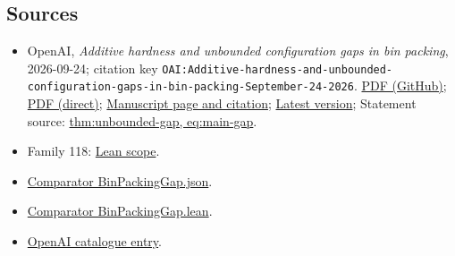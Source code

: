\documentclass[11pt]{article}
\begin{document}
\subsection{Sources}
\begin{itemize}
\item OpenAI, \emph{Additive hardness and unbounded configuration gaps in bin packing}, 2026-09-24; citation key \texttt{OAI:Additive-hardness-and-unbounded-configuration-gaps-in-bin-packing-September-24-2026}. \href{https://github.com/openai/math/blob/adc7f1241b42e322a6451854ab7e4b4c146bf78a/preprints/Additive-hardness-and-unbounded-configuration-gaps-in-bin-packing-September-24-2026/Additive-hardness-and-unbounded-configuration-gaps-in-bin-packing-September-24-2026.pdf}{PDF (GitHub)}; \href{https://github.com/openai/math/raw/adc7f1241b42e322a6451854ab7e4b4c146bf78a/preprints/Additive-hardness-and-unbounded-configuration-gaps-in-bin-packing-September-24-2026/Additive-hardness-and-unbounded-configuration-gaps-in-bin-packing-September-24-2026.pdf}{PDF (direct)}; \href{https://github.com/openai/math/blob/adc7f1241b42e322a6451854ab7e4b4c146bf78a/preprints/Additive-hardness-and-unbounded-configuration-gaps-in-bin-packing-September-24-2026/README.md}{Manuscript page and citation}; \href{https://github.com/openai/math/blob/main/preprints/Additive-hardness-and-unbounded-configuration-gaps-in-bin-packing-September-24-2026/Additive-hardness-and-unbounded-configuration-gaps-in-bin-packing-September-24-2026.pdf}{Latest version}; Statement source: \href{https://github.com/openai/math/blob/adc7f1241b42e322a6451854ab7e4b4c146bf78a/preprints/Additive-hardness-and-unbounded-configuration-gaps-in-bin-packing-September-24-2026/build/source/introduction.tex\#L87}{thm:unbounded-gap, eq:main-gap}.
\item Family 118: \href{https://github.com/openai/math/blob/adc7f1241b42e322a6451854ab7e4b4c146bf78a/lean/docs/118.md}{Lean scope}.
\item \href{https://github.com/openai/math/blob/adc7f1241b42e322a6451854ab7e4b4c146bf78a/lean/ComparatorChallenges/BinPackingGap.json}{Comparator BinPackingGap.json}.
\item \href{https://github.com/openai/math/blob/adc7f1241b42e322a6451854ab7e4b4c146bf78a/lean/ComparatorChallenges/BinPackingGap.lean}{Comparator BinPackingGap.lean}.
\item \href{https://github.com/openai/math/blob/adc7f1241b42e322a6451854ab7e4b4c146bf78a/CONTENTS.md}{OpenAI catalogue entry}.
\end{itemize}
\end{document}
